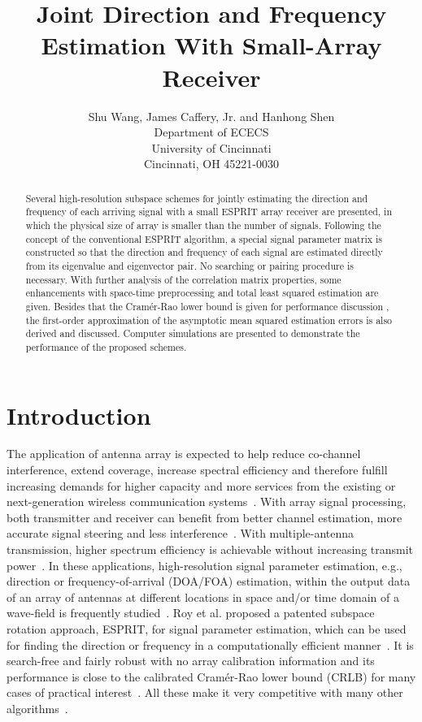 \documentclass[a4paper,10pt,fleqn,twocolumn]{IEEEtran}
\title{Joint Direction and Frequency Estimation With Small-Array Receiver}
\author{{Shu Wang, James Caffery, Jr. and Hanhong Shen} \\ Department of ECECS \\ University of Cincinnati \\Cincinnati, OH 45221-0030}
\begin{document}
\maketitle
\begin{abstract}
Several high-resolution subspace schemes for jointly estimating
the direction and frequency of each arriving signal with a small
ESPRIT array receiver are presented, in which the physical size of
array is smaller than the number of signals. Following the concept
of the conventional ESPRIT algorithm, a special signal parameter
matrix is constructed so that the direction and frequency of each
signal are estimated directly from its eigenvalue and eigenvector
pair. No searching or pairing procedure is necessary. With further
analysis of the correlation matrix properties, some enhancements
with space-time preprocessing and total least squared estimation
are given. Besides that the Cram\'er-Rao lower bound is given for
performance discussion , the first-order approximation of the
asymptotic mean squared estimation errors is also derived and
discussed. Computer simulations are presented to demonstrate the
performance of the proposed schemes.
\end{abstract}
\section{Introduction}
The application of antenna array is expected to help reduce
co-channel interference, extend coverage, increase spectral
efficiency and therefore fulfill increasing demands for higher
capacity and more services from the existing or next-generation
wireless communication systems~\cite{Ghav05,Dohl07}. With array
signal processing, both transmitter and receiver can benefit from
better channel estimation, more accurate signal steering and less
interference~\cite{Ghav05}. With multiple-antenna transmission,
higher spectrum efficiency is achievable without increasing
transmit power~\cite{Dohl07}. In these applications,
high-resolution signal parameter estimation, e.g., direction or
frequency-of-arrival (DOA/FOA) estimation, within the output data
of an array of antennas at different locations in space and/or
time domain of a wave-field is frequently studied~\cite{Ghav05}.
Roy et al. proposed a patented subspace rotation approach, ESPRIT,
for signal parameter estimation, which can be used for finding the
direction or frequency in a computationally efficient
manner~\cite{Roy89}. It is search-free and fairly robust with no
array calibration information and its performance is close to the
calibrated Cram\'er-Rao lower bound (CRLB) for many cases of
practical interest~\cite{Roy89}. All these make it very
competitive with many other algorithms~\cite{Ghav05}.
\end{document}
